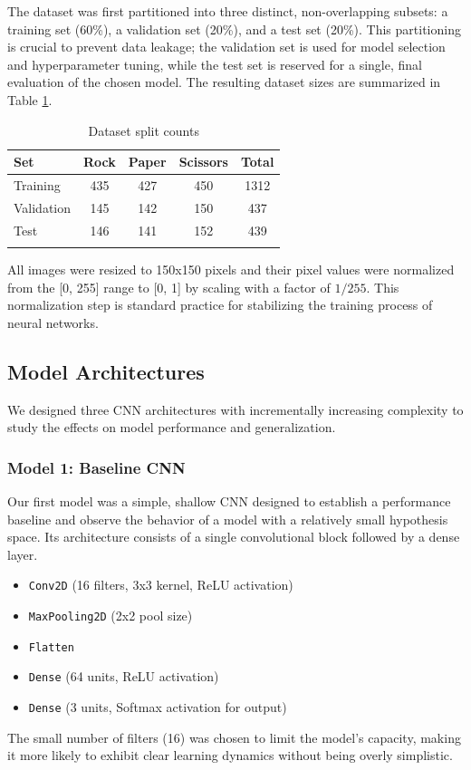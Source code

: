 \documentclass[pdflatex,sn-mathphys-num]{sn-jnl}%
\theoremstyle{thmstyleone}%
\theoremstyle{thmstyletwo}%
\theoremstyle{thmstylethree}%
\begin{document}
The dataset was first partitioned into three distinct, non-overlapping subsets: a training set (60\%), a validation set (20\%), and a test set (20\%). This partitioning is crucial to prevent data leakage; the validation set is used for model selection and hyperparameter tuning, while the test set is reserved for a single, final evaluation of the chosen model. The resulting dataset sizes are summarized in Table \ref{tab:split}.

\begin{table}[h]
\caption{Dataset split counts}\label{tab:split}%
\begin{tabular}{@{}lcccc@{}}
\toprule
Set & Rock & Paper & Scissors & Total \\
\midrule
Training & 435 & 427 & 450 & 1312 \\
Validation & 145 & 142 & 150 & 437 \\
Test & 146 & 141 & 152 & 439 \\
\botrule
\end{tabular}
\end{table}

All images were resized to 150x150 pixels and their pixel values were normalized from the [0, 255] range to [0, 1] by scaling with a factor of $1/255$. This normalization step is standard practice for stabilizing the training process of neural networks.

\subsection{Model Architectures}
We designed three CNN architectures with incrementally increasing complexity to study the effects on model performance and generalization.

\subsubsection{Model 1: Baseline CNN}
Our first model was a simple, shallow CNN designed to establish a performance baseline and observe the behavior of a model with a relatively small hypothesis space. Its architecture consists of a single convolutional block followed by a dense layer.
\begin{itemize}
    \item \texttt{Conv2D} (16 filters, 3x3 kernel, ReLU activation)
    \item \texttt{MaxPooling2D} (2x2 pool size)
    \item \texttt{Flatten}
    \item \texttt{Dense} (64 units, ReLU activation)
    \item \texttt{Dense} (3 units, Softmax activation for output)
\end{itemize}
The small number of filters (16) was chosen to limit the model's capacity, making it more likely to exhibit clear learning dynamics without being overly simplistic.
\end{document}
